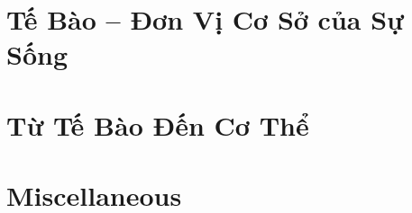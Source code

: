 \documentclass{article}
\begin{document}
\section{Tế Bào -- Đơn Vị Cơ Sở của Sự Sống}


\section{Từ Tế Bào Đến Cơ Thể}


\section{Miscellaneous}


\printbibliography[heading=bibintoc]
	
\end{document}
